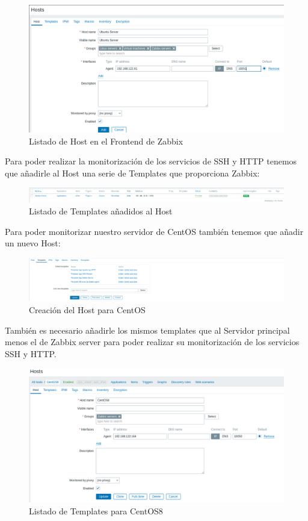 \begin{figure}[H]
	\centering
	\includegraphics[scale=0.4]{graphics/img25}
	\caption{Listado de Host en el Frontend de Zabbix}
\end{figure}

Para poder realizar la monitorización de los servicios de SSH y HTTP tenemos que añadirle al Host una serie de Templates que proporciona Zabbix:

\begin{figure}[H]
	\centering
	\includegraphics[scale=0.25]{graphics/img26}
	\caption{Listado de Templates añadidos al Host}
\end{figure}

Para poder monitorizar nuestro servidor de CentOS también tenemos que añadir un nuevo Host:

\begin{figure}[H]
	\centering
	\includegraphics[scale=0.5]{graphics/img27}
	\caption{Creación del Host para CentOS}
\end{figure}

También es necesario añadirle los mismos templates que al Servidor principal menos el de Zabbix server para poder realizar su monitorización de los servicios SSH y HTTP.

\begin{figure}[H]
	\centering
	\includegraphics[scale=0.4]{graphics/img28}
	\caption{Listado de Templates para CentOS8}
\end{figure}

